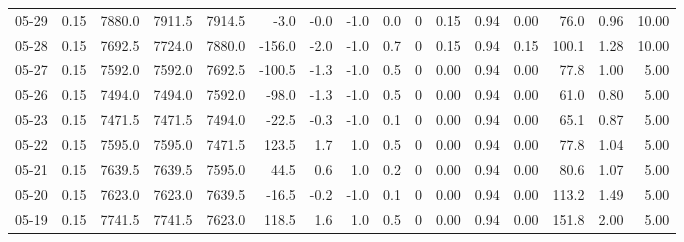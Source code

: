 \begin{threeparttable}
{\begin{tabular}{lrrrrrrrrrrrrrrr}
  05-29 &     0.15 & 7880.0 & 7911.5 & 7914.5 &       -3.0 &           -0.0 &                     -1.0 &                 0.0 &              0 &       0.15 &      0.94 &           0.00 &             76.0 &            0.96 &                  10.00 \\
  05-28 &     0.15 & 7692.5 & 7724.0 & 7880.0 &     -156.0 &           -2.0 &                     -1.0 &                 0.7 &              0 &       0.15 &      0.94 &           0.15 &            100.1 &            1.28 &                  10.00 \\
  05-27 &     0.15 & 7592.0 & 7592.0 & 7692.5 &     -100.5 &           -1.3 &                     -1.0 &                 0.5 &              0 &       0.00 &      0.94 &           0.00 &             77.8 &            1.00 &                   5.00 \\
  05-26 &     0.15 & 7494.0 & 7494.0 & 7592.0 &      -98.0 &           -1.3 &                     -1.0 &                 0.5 &              0 &       0.00 &      0.94 &           0.00 &             61.0 &            0.80 &                   5.00 \\
  05-23 &     0.15 & 7471.5 & 7471.5 & 7494.0 &      -22.5 &           -0.3 &                     -1.0 &                 0.1 &              0 &       0.00 &      0.94 &           0.00 &             65.1 &            0.87 &                   5.00 \\
  05-22 &     0.15 & 7595.0 & 7595.0 & 7471.5 &      123.5 &            1.7 &                      1.0 &                 0.5 &              0 &       0.00 &      0.94 &           0.00 &             77.8 &            1.04 &                   5.00 \\
  05-21 &     0.15 & 7639.5 & 7639.5 & 7595.0 &       44.5 &            0.6 &                      1.0 &                 0.2 &              0 &       0.00 &      0.94 &           0.00 &             80.6 &            1.07 &                   5.00 \\
  05-20 &     0.15 & 7623.0 & 7623.0 & 7639.5 &      -16.5 &           -0.2 &                     -1.0 &                 0.1 &              0 &       0.00 &      0.94 &           0.00 &            113.2 &            1.49 &                   5.00 \\
  05-19 &     0.15 & 7741.5 & 7741.5 & 7623.0 &      118.5 &            1.6 &                      1.0 &                 0.5 &              0 &       0.00 &      0.94 &           0.00 &            151.8 &            2.00 &                   5.00 \\

\end{tabular}}
\end{threeparttable}
